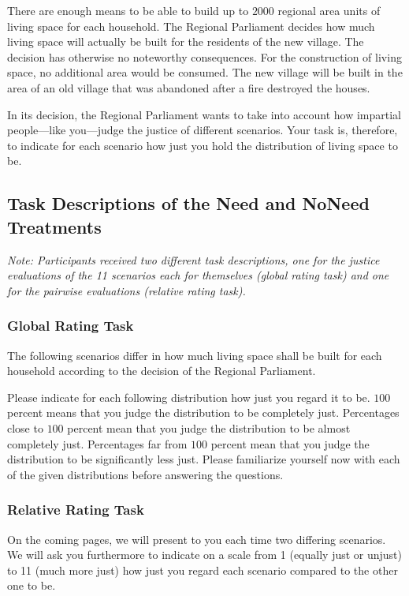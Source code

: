 \documentclass[12pt]{scrartcl}
\begin{document}
There are enough means to be able to build up to $2000$ regional area units of living space for each household.
The Regional Parliament decides how much living space will actually be built for the residents of the new village.
The decision has otherwise no noteworthy consequences.
For the construction of living space, no additional area would be consumed.
The new village will be built in the area of an old village that was abandoned after a fire destroyed the houses.

In its decision, the Regional Parliament wants to take into account how impartial people---like you---judge the justice of different scenarios.
Your task is, therefore, to indicate for each scenario how just you hold the distribution of living space to be.


\subsection*{Task Descriptions of the Need and NoNeed Treatments}
\textit{Note: Participants received two different task descriptions, one for the justice evaluations of the 11 scenarios each for themselves (global rating task) and one for the pairwise evaluations (relative rating task).}

\subsubsection*{Global Rating Task}
The following scenarios differ in how much living space shall be built for each household according to the decision of the Regional Parliament.

Please indicate for each following distribution how just you regard it to be.
$100$ percent means that you judge the distribution to be completely just.
Percentages close to $100$ percent mean that you judge the distribution to be almost completely just.
Percentages far from $100$ percent mean that you judge the distribution to be significantly
less just.
Please familiarize yourself now with each of the given distributions before answering the questions.

\subsubsection*{Relative Rating Task}
On the coming pages, we will present to you each time two differing scenarios. We will ask you furthermore to indicate on a scale from 1 (equally just or unjust) to 11 (much more just) how just you regard each scenario compared to the other one to be.
\end{document}
